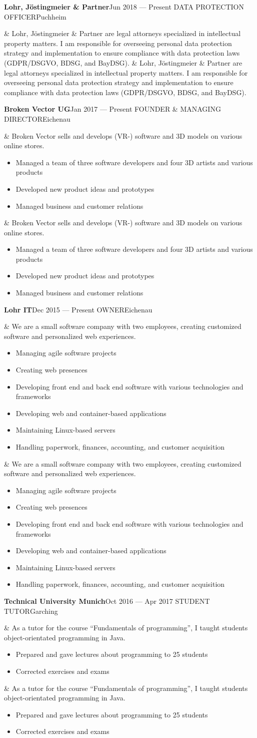 \documentclass[a4paper, 11pt, final, oneside, notitlepage]{article}
\newcommand*{\bodyfont}{\sourcesanspro}
\newcommand*{\entrytitlestyle}[1]{{\fontsize{9pt}{1em}\bodyfont\scshape\color{MaterialBlueGrey800} #1}}
\newcommand*{\entrylocationstyle}[1]{{\fontsize{9pt}{1em}\bodyfont #1}}
\newcommand*{\entry}[5]{
  \vspace{0.55ex}
  \noindent\begin{minipage}{\linewidth}
    \textbf{#1}\hfill#2
    \newline
    \entrytitlestyle{\MakeUppercase{#3}}\hfill\entrylocationstyle{#4}\par
    \ifx&#5&%
    \else
    #5
    \fi
  \end{minipage}
}
\begin{document}
  \entry{Lohr, Jöstingmeier \& Partner}{Jun 2018 --- Present}{Data Protection Officer}{Puchheim}{%
    Lohr, Jöstingmeier \& Partner are legal attorneys specialized in intellectual property matters.
    I am responsible for overseeing personal data protection strategy and implementation to ensure compliance with data protection laws (GDPR/DSGVO, BDSG, and BayDSG).
  }

  \entry{Broken Vector UG}{Jan 2017 --- Present}{Founder \& Managing Director}{Eichenau}{%
    Broken Vector sells and develops (VR-) software and 3D models on various online stores.
    \begin{itemize}[noitemsep, nosep]
      \item Managed a team of three software developers and four 3D artists and various products
      \item Developed new product ideas and prototypes
      \item Managed business and customer relations
    \end{itemize}
  }

  \entry{Lohr IT}{Dec 2015 --- Present}{Owner}{Eichenau}{%
    We are a small software company with two employees, creating customized software and personalized web experiences.
    \begin{itemize}[noitemsep, nosep]
      \item Managing agile software projects
      \item Creating web presences
      \item Developing front end and back end software with various technologies and frameworks
      \item Developing web and container-based applications
      \item Maintaining Linux-based servers
      \item Handling paperwork, finances, accounting, and customer acquisition
    \end{itemize}
  }

  \entry{Technical University Munich}{Oct 2016 --- Apr 2017}{Student Tutor}{Garching}{%
    As a tutor for the course \enquote{Fundamentals of programming}, I taught students object-orientated programming in Java.
    \begin{itemize}[noitemsep, nosep]
      \item Prepared and gave lectures about programming to 25 students
      \item Corrected exercises and exams
    \end{itemize}
  }
\end{document}
